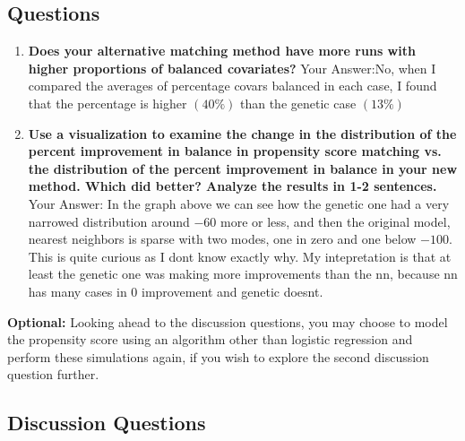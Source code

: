 \documentclass[
]{article}
\begin{document}
\hypertarget{questions-2}{%
\subsection{Questions}\label{questions-2}}

\begin{enumerate}
    \item \textbf{Does your alternative matching method have more runs with higher proportions of balanced covariates?}
     Your Answer:No, when I compared the averages of percentage covars balanced in each case, I found that the percentage is higher $(40\%)$ than the genetic case $(13\%)$ 
    \item \textbf{Use a visualization to examine the change in the distribution of the percent improvement in balance in propensity score matching vs. the distribution of the percent improvement in balance in your new method. Which did better? Analyze the results in 1-2 sentences.} 
    Your Answer: In the graph above we can see how the genetic one had a very narrowed distribution around $-60$ more or less, and then the original model, nearest neighbors is sparse with two modes, one in zero and one below $-100$. This is quite curious as I dont know exactly why. My intepretation is that at least the genetic one was making more improvements than the nn, because nn has many cases in 0 improvement and genetic doesnt. 
\end{enumerate}

\textbf{Optional:} Looking ahead to the discussion questions, you may
choose to model the propensity score using an algorithm other than
logistic regression and perform these simulations again, if you wish to
explore the second discussion question further.

\hypertarget{discussion-questions}{%
\subsection{Discussion Questions}\label{discussion-questions}}
\end{document}

